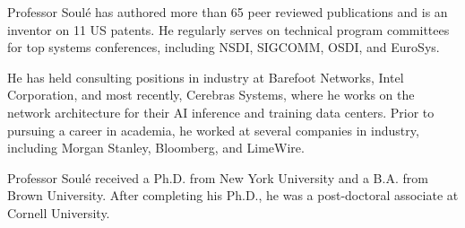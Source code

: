 \documentclass[11pt]{article}
\begin{document}
Professor Soul\'{e} has authored more than 65 peer reviewed
publications and is an inventor on 11 US patents. He regularly serves
on technical program committees for top systems conferences, including
NSDI, SIGCOMM, OSDI, and EuroSys.

He has held consulting positions in industry at Barefoot Networks,
Intel Corporation, and most recently, Cerebras Systems, where he works
on the network architecture for their AI inference and training data
centers.  Prior to pursuing a career in academia, he worked at several
companies in industry, including Morgan Stanley, Bloomberg, and
LimeWire.

Professor Soul\'{e} received a Ph.D. from New York University and a
B.A. from Brown University. After completing his Ph.D., he was a
post-doctoral associate at Cornell University.
\end{document}
